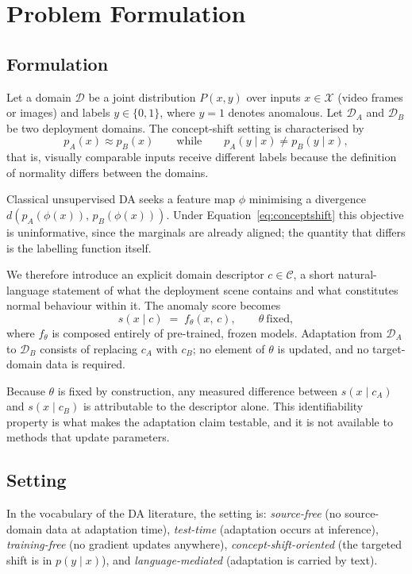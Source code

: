\documentclass[a4paper,fleqn]{cas-sc}
\begin{document}
\section{Problem Formulation}
\label{sec:problem}

\subsection{Formulation}
Let a domain $\mathcal{D}$ be a joint distribution $P(x,y)$ over inputs
$x \in \mathcal{X}$ (video frames or images) and labels $y \in \{0,1\}$, where
$y=1$ denotes anomalous. Let $\mathcal{D}_A$ and $\mathcal{D}_B$ be two
deployment domains. The concept-shift setting is characterised by
\begin{equation}
p_A(x) \approx p_B(x)
\qquad\text{while}\qquad
p_A(y \mid x) \neq p_B(y \mid x),
\label{eq:conceptshift}
\end{equation}
that is, visually comparable inputs receive different labels because the
definition of normality differs between the domains.

Classical unsupervised DA seeks a feature map $\phi$ minimising a divergence
$d\!\left(p_A(\phi(x)),\, p_B(\phi(x))\right)$. Under
Equation~\eqref{eq:conceptshift} this objective is uninformative, since the
marginals are already aligned; the quantity that differs is the labelling
function itself.

We therefore introduce an explicit domain descriptor $c \in \mathcal{C}$, a short
natural-language statement of what the deployment scene contains and what
constitutes normal behaviour within it. The anomaly score becomes
\begin{equation}
s(x \mid c) \;=\; f_\theta(x,\, c), \qquad \theta \ \text{fixed},
\label{eq:score}
\end{equation}
where $f_\theta$ is composed entirely of pre-trained, frozen models. Adaptation
from $\mathcal{D}_A$ to $\mathcal{D}_B$ consists of replacing $c_A$ with $c_B$;
no element of $\theta$ is updated, and no target-domain data is required.

Because $\theta$ is fixed by construction, any measured difference between
$s(x\mid c_A)$ and $s(x\mid c_B)$ is attributable to the descriptor alone. This
identifiability property is what makes the adaptation claim testable, and it is
not available to methods that update parameters.

\subsection{Setting}
In the vocabulary of the DA literature, the setting is: \emph{source-free} (no
source-domain data at adaptation time), \emph{test-time} (adaptation occurs at
inference), \emph{training-free} (no gradient updates anywhere),
\emph{concept-shift-oriented} (the targeted shift is in $p(y\mid x)$), and
\emph{language-mediated} (adaptation is carried by text).
\end{document}
